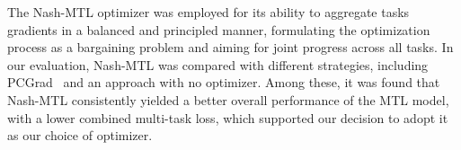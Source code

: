 The Nash-MTL optimizer was employed for its ability to aggregate tasks gradients in a balanced and principled manner, formulating the optimization process as a bargaining problem and aiming for joint progress across all tasks. In our evaluation, Nash-MTL was compared with different strategies, including PCGrad~\cite{yu2020pcgrad}  and an approach with no optimizer. Among these, it was found that Nash-MTL consistently yielded a better overall performance of the MTL model, with a lower combined multi-task loss, which supported our decision to adopt it as our choice of optimizer.
